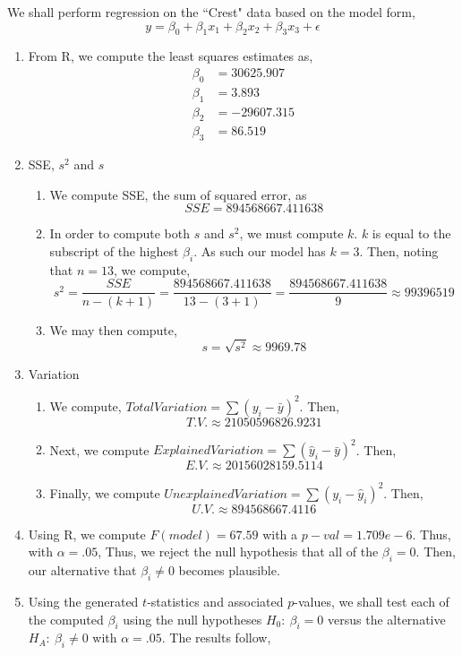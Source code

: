 \documentclass[letterpaper,10pt]{article}
\begin{document}
We shall perform regression on the ``Crest" data based on the model form,
\[y=\beta_0+\beta_1x_1+\beta_2x_2+\beta_3x_3+\epsilon\]
\begin{enumerate}
\item From R, we compute the least squares estimates as,
\begin{align*}
\beta_0 &=30625.907\\
\beta_1 &=3.893\\
\beta_2 &=-29607.315\\
\beta_3 &=86.519
\end{align*}
\item SSE, $s^2$ and $s$
\begin{enumerate}
\item We compute SSE, the sum of squared error, as
\[SSE=894568667.411638\]
\item In order to compute both $s$ and $s^2$, we must compute $k$. $k$ is equal to the subscript of the highest $\beta_i$. As such our model has $k=3$. Then, noting that $n=13$, we compute,
\[s^2=\frac{SSE}{n-(k+1)}=\frac{894568667.411638}{13-(3+1)}=\frac{894568667.411638}{9}\approx 99396519\]
\item We may then compute,
\[s=\sqrt{s^2}\approx 9969.78\]
\end{enumerate}
\item Variation
\begin{enumerate}
\item We compute, $Total Variation = \sum(y_i-\bar{y})^2$. Then,
\[T.V.\approx 21050596826.9231\]
\item Next, we compute $ExplainedVariation = \sum(\hat{y}_i-\bar{y})^2$. Then,
\[E.V.\approx 20156028159.5114\]
\item Finally, we compute $UnexplainedVariation = \sum(y_i-\hat{y}_i)^2$. Then,
\[U.V.\approx 894568667.4116\]
\end{enumerate}
\item Using R, we compute $F(model)=67.59$ with a $p-val=1.709e-6$. Thus, with $\alpha=.05$, Thus, we reject the null hypothesis that all of the $\beta_i=0$. Then, our alternative that $\beta_i\neq 0$ becomes plausible.
\item Using the generated $t$-statistics and associated $p$-values, we shall test each of the computed $\beta_i$ using the null hypotheses $H_0:\ \beta_i=0$ versus the alternative $H_A:\ \beta_i\neq 0$ with $\alpha=.05$. The results follow,\\
\begin{center}
\begin{tabular}{c|c|c|c|l}

\end{tabular}
\end{center}
\end{enumerate}
\end{document}
